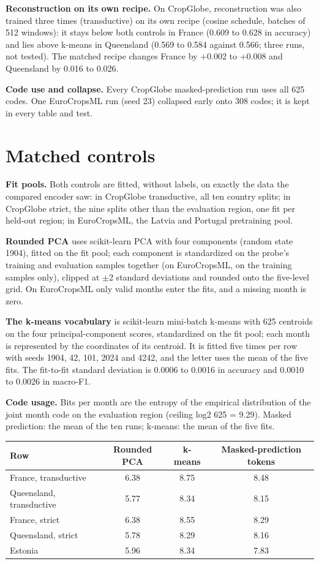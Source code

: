 \documentclass[10pt]{article}
\begin{document}
\textbf{Reconstruction on its own recipe.} On CropGlobe, reconstruction was also trained three times (transductive) on its own recipe (cosine schedule, batches of 512 windows): it stays below both controls in France (0.609 to 0.628 in accuracy) and lies above k-means in Queensland (0.569 to 0.584 against 0.566; three runs, not tested). The matched recipe changes France by +0.002 to +0.008 and Queensland by \textminus{}0.016 to \textminus{}0.026.

\textbf{Code use and collapse.} Every CropGlobe masked-prediction run uses all 625 codes. One EuroCropsML run (seed 23) collapsed early onto 308 codes; it is kept in every table and test.

\section{Matched controls}

\textbf{Fit pools.} Both controls are fitted, without labels, on exactly the data the compared encoder saw: in CropGlobe transductive, all ten country splits; in CropGlobe strict, the nine splits other than the evaluation region, one fit per held-out region; in EuroCropsML, the Latvia and Portugal pretraining pool.

\textbf{Rounded PCA} uses scikit-learn PCA with four components (random state 1904), fitted on the fit pool; each component is standardized on the probe's training and evaluation samples together (on EuroCropsML, on the training samples only), clipped at $\pm$2 standard deviations and rounded onto the five-level grid. On EuroCropsML only valid months enter the fits, and a missing month is zero.

\textbf{The k-means vocabulary} is scikit-learn mini-batch k-means with 625 centroids on the four principal-component scores, standardized on the fit pool; each month is represented by the coordinates of its centroid. It is fitted five times per row with seeds 1904, 42, 101, 2024 and 4242, and the letter uses the mean of the five fits. The fit-to-fit standard deviation is 0.0006 to 0.0016 in accuracy and 0.0010 to 0.0026 in macro-F1.

\textbf{Code usage.} Bits per month are the entropy of the empirical distribution of the joint month code on the evaluation region (ceiling log2 625 = 9.29). Masked prediction: the mean of the ten runs; k-means: the mean of the five fits.

\begin{center}\footnotesize
\begin{tabular}{@{}lccc@{}}
\toprule
Row & Rounded PCA & k-means & Masked-prediction tokens \\
\midrule
France, transductive & 6.38 & 8.75 & 8.48 \\
Queensland, transductive & 5.77 & 8.34 & 8.15 \\
France, strict & 6.38 & 8.55 & 8.29 \\
Queensland, strict & 5.78 & 8.29 & 8.16 \\
Estonia & 5.96 & 8.34 & 7.83 \\
\bottomrule
\end{tabular}
\end{center}
\end{document}
